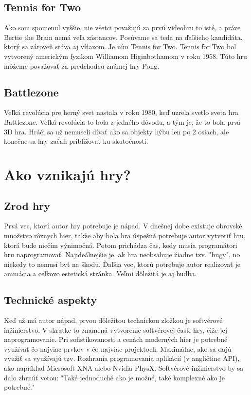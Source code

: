 \documentclass[10pt,twoside,slovak,a4paper]{article}
\begin{document}
\subsection{Tennis for Two} \label{historia:tennis}
Ako som spomenul vyššie, nie všetci považujú za prvú videohru to isté, a práve Bertie the Brain nemá veľa zástancov. Posúvame sa teda na ďaľšieho kandidáta, ktorý sa zároveň stáva aj víťazom. Je ním Tennis for Two. Tennis for Two bol vytvorený americkým fyzikom Williamom Higinbothamom v roku 1958. Túto hru môžeme považovať za predchodcu známej hry Pong.

\subsection{Battlezone} \label{historia:battlezone}
Veľká revolúcia pre herný svet nastala v roku 1980, keď uzrela svetlo sveta hra Battlezone. Veľká revolúcia to bola z jedného dôvodu, a tým je, že to bola prvá 3D hra. Hráči sa už nemuseli dívať ako sa objekty hýbu len po 2 osiach, ale konečne sa hry začali približovať ku skutočnosti.
\section{Ako vznikajú hry?} \label{pocitacove}

\subsection{Zrod hry}

Prvá vec, ktorú autor hry potrebuje je nápad. V dnešnej dobe existuje obrovské množstvo rôznych hier, takže aby bola hra úspešná potrebuje autor vytvoriť hru, ktorá bude niečím výnimočná. Potom prichádza čas, kedy musia programátori hru naprogramovať. Najideálnejšie je, ak hra neobsahuje žiadne tzv. "bugy", no niekedy to nemusí byť na škodu. Ďaľšia vec, ktorú potrebuje autor realizovať je animácia a celkovo estetická stránka. Veľmi dôležitá je aj hudba.

\subsection{Technické aspekty}

Keď už má autor nápad, prvou dôležitou technickou zložkou je softvérové inžinierstvo. V skratke to znamená vytvorenie softvérovej časti hry, čiže jej naprogramovanie. Pri sofistikovanosti a cenách moderných hier je potrebné využívať čo najviac prvkov v čo najviac projektoch. Maximálne, ako sa dajú využiť sa využívajú tzv. Rozhrania programovania aplikácií (v angličtine API), ako napríklad Microsoft XNA alebo Nvidia PhysX. Softvérové inžinierstvo by sa dalo zhrnúť vetou: "Také jednoduché ako je možné, také komplexné ako je potrebné."
\end{document}
